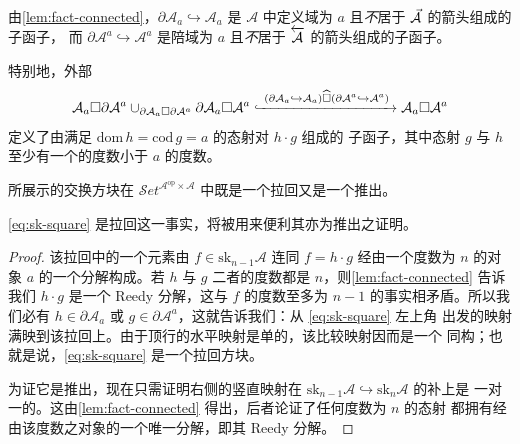 由\cref{lem:fact-connected}，$\partial\mathcal{A}_a\hookrightarrow\mathcal{A}_a$
是 $\mathcal{A}$ 中定义域为 $a$ 且\emph{不}居于 $\vec{\mathcal{A}}$ 的箭头组成的子函子，
而 $\partial\mathcal{A}^{a}\hookrightarrow\mathcal{A}^{a}$ 是陪域为 $a$
且\emph{不}居于 $\overleftarrow{\mathcal{A}}$ 的箭头组成的子函子。

特别地，外部\trLeibnizProduct
\[ \mathcal{A}_a\square\partial\mathcal{A}^{a}
   \cup_{\partial\mathcal{A}_a\square\partial\mathcal{A}^{a}}
   \partial\mathcal{A}_a\square\mathcal{A}^{a}
   \xhookrightarrow{\ (\partial\mathcal{A}_a\hookrightarrow\mathcal{A}_a)
   \mathbin{\widehat{\square}}(\partial\mathcal{A}^{a}\hookrightarrow\mathcal{A}^{a})\ }
   \mathcal{A}_a\square\mathcal{A}^{a} \]
定义了由满足 $\mathrm{dom}\,h=\mathrm{cod}\,g=a$ 的态射对 $h\cdot g$ 组成的
子函子，其中态射 $g$ 与 $h$ 至少有一个的度数小于 $a$ 的度数。

\begin{proposition}\label{prop:sk-square-pullback-pushout}
所展示的交换方块在 $\mathcal{S}et^{\mathcal{A}^{\mathrm{op}}\times\mathcal{A}}$
中既是一个拉回又是一个推出。
\begin{rveq}\label{eq:sk-square}
\end{rveq}
\end{proposition}

\eqref{eq:sk-square} 是拉回这一事实，将被用来便利其亦为推出之证明。

\begin{proof}
该拉回中的一个元素由 $f\in\mathrm{sk}_{n-1}\mathcal{A}$ 连同 $f=h\cdot g$
经由一个度数为 $n$ 的对象 $a$ 的一个分解构成。若 $h$ 与 $g$ 二者的度数都是
$n$，则\cref{lem:fact-connected} 告诉我们 $h\cdot g$ 是一个 Reedy 分解，这与
$f$ 的度数至多为 $n-1$ 的事实相矛盾。所以我们必有 $h\in\partial\mathcal{A}_a$
或 $g\in\partial\mathcal{A}^{a}$，这就告诉我们：从 \eqref{eq:sk-square} 左上角
出发的映射满映到该拉回上。由于顶行的水平映射是单的，该比较映射因而是一个
同构；也就是说，\eqref{eq:sk-square} 是一个拉回方块。

为证它是推出，现在只需证明右侧的竖直映射在
$\mathrm{sk}_{n-1}\mathcal{A}\hookrightarrow\mathrm{sk}_n\mathcal{A}$ 的补上是
一对一的。这由\cref{lem:fact-connected} 得出，后者论证了任何度数为 $n$ 的态射
都拥有经由该度数之对象的一个唯一分解，即其 Reedy 分解。
\end{proof}

